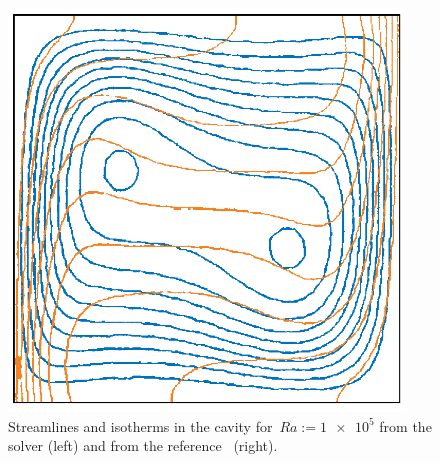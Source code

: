 \documentclass[10pt, ngerman, english,
twoside, open=right,
numbers=noenddot,
declaration=section,
abstract=section,
abstract=multiple,
abstract=notoc,
declaration=notoc,
cd=pale, 
chapterprefix=off, 
chapterpage=false, 
headingsvskip=-10em,
cdgeometry=custom, 
slantedgreek=on,
cdmath=on, 
cdfont=on,
ttfont=false,
mathswap=off,
]{tudscrreprt}
\numberwithin{equation}{chapter}
\begin{document}
\begin{figure}[!t]
\centering
\begin{minipage}[c]{0.54\linewidth}

\end{minipage}
\hfill
\begin{minipage}[c]{0.45\linewidth}
\includegraphics[width=0.94\textwidth]{deVahl_plot.png}\vspace*{15pt}
\end{minipage}
\caption{Streamlines and isotherms in the cavity for~$Ra:=\num{1e5}$ from the solver (left) and from the reference~\cite[see][Fig.~3(c), Fig.~4(c)]{DeVahl} (right).}\label{fig:Perf_Cavity1E5}
\end{figure}
\end{document}
